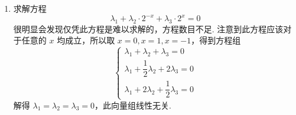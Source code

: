 \documentclass[12pt,fontset=fandol]{ctexart}
\begin{document}
\begin{solve}
\begin{enumerate}
        \item 求解方程
              \[\lambda_1 + \lambda_2·2^{-x} + \lambda_3·2^x = 0\]
              很明显会发现仅凭此方程是难以求解的，方程数目不足. 注意到此方程应该对于任意的 $x$ 均成立，所以取 $x = 0, x = 1, x = -1$，得到方程组
              \[ \begin{cases}
                      \lambda_1 + \lambda_2 + \lambda_3 = 0              \\[1ex]
                      \lambda_1 + \dfrac{1}{2}\lambda_2 + 2\lambda_3 = 0 \\[1ex]
                      \lambda_1 + 2\lambda_2 + \dfrac{1}{2}\lambda_3 = 0
                  \end{cases} \]
              解得 $\lambda_1 = \lambda_2 = \lambda_3 = 0$，此向量组线性无关.
    \end{enumerate}
\end{solve}
\end{document}
